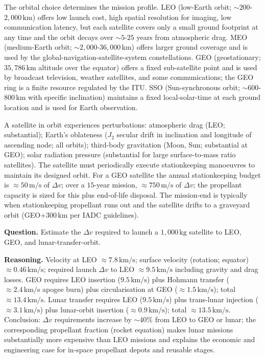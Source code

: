 The orbital choice determines the mission profile. LEO (low-Earth orbit; $\sim 200$-$2{,}000\,\text{km}$) offers low launch cost, high spatial resolution for imaging, low communication latency, but each satellite covers only a small ground footprint at any time and the orbit decays over $\sim 5$-$25$ years from atmospheric drag. MEO (medium-Earth orbit; $\sim 2{,}000$-$36{,}000\,\text{km}$) offers larger ground coverage and is used by the global-navigation-satellite-system constellations. GEO (geostationary; $35{,}786\,\text{km}$ altitude over the equator) offers a fixed sub-satellite point and is used by broadcast television, weather satellites, and some communications; the GEO ring is a finite resource regulated by the ITU. SSO (Sun-synchronous orbit; $\sim 600$-$800\,\text{km}$ with specific inclination) maintains a fixed local-solar-time at each ground location and is used for Earth observation.

\begin{archetype}
A satellite in orbit experiences perturbations: atmospheric drag (LEO; substantial); Earth's oblateness ($J_2$ secular drift in inclination and longitude of ascending node; all orbits); third-body gravitation (Moon, Sun; substantial at GEO); solar radiation pressure (substantial for large surface-to-mass ratio satellites). The satellite must periodically execute stationkeeping manoeuvres to maintain its designed orbit. For a GEO satellite the annual stationkeeping budget is $\approx 50\,\text{m/s}$ of $\Delta v$; over a $15$-year mission, $\approx 750\,\text{m/s}$ of $\Delta v$; the propellant capacity is sized for this plus end-of-life disposal. The mission-end is typically when stationkeeping propellant runs out and the satellite drifts to a graveyard orbit (GEO+$300\,\text{km}$ per IADC guidelines).
\end{archetype}

\begin{estimation}
\textbf{Question.} Estimate the $\Delta v$ required to launch a $1{,}000\,\text{kg}$ satellite to LEO, GEO, and lunar-transfer-orbit.

\textbf{Reasoning.} Velocity at LEO $\approx 7.8\,\text{km/s}$; surface velocity (rotation; equator) $\approx 0.46\,\text{km/s}$; required launch $\Delta v$ to LEO $\approx 9.5\,\text{km/s}$ including gravity and drag losses. GEO requires LEO insertion ($9.5\,\text{km/s}$) plus Hohmann transfer ($\approx 2.4\,\text{km/s}$ apogee burn) plus circularisation at GEO ($\approx 1.5\,\text{km/s}$); total $\approx 13.4\,\text{km/s}$. Lunar transfer requires LEO ($9.5\,\text{km/s}$) plus trans-lunar injection ($\approx 3.1\,\text{km/s}$) plus lunar-orbit insertion ($\approx 0.9\,\text{km/s}$); total $\approx 13.5\,\text{km/s}$. Conclusion: $\Delta v$ requirements increase by $\sim 40\%$ from LEO to GEO or lunar; the corresponding propellant fraction (rocket equation) makes lunar missions substantially more expensive than LEO missions and explains the economic and engineering case for in-space propellant depots and reusable stages.
\end{estimation}

